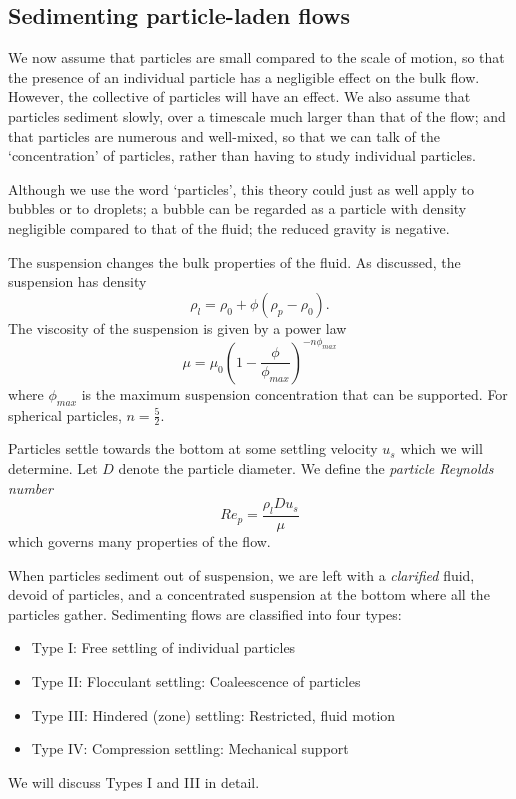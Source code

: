 \subsection{Sedimenting particle-laden flows}

We now assume that particles are small compared to the scale of motion, so that
the presence of an individual particle has a negligible effect on the bulk flow.
However, the collective of particles will have an effect. We also assume that
particles sediment slowly, over a timescale much larger than that of the flow;
and that particles are numerous and well-mixed, so that we can talk of the
`concentration' of particles, rather than having to study individual particles.

Although we use the word `particles', this theory could just as well apply to
bubbles or to droplets; a bubble can be regarded as a particle with density
negligible compared to that of the fluid; the reduced gravity is negative.

The suspension changes the bulk properties of the fluid. As discussed, the 
suspension has density
\begin{equation}
        \rho_l = \rho_0 + \phi (\rho_p - \rho_0).
\end{equation}
The viscosity of the suspension is given by a power law
\begin{equation}
 \mu = \mu_0 \left( 1 - \frac{\phi}{\phi_{max}} \right)^{-n \phi_{max}}
\end{equation}
where $\phi_{max}$ is the maximum suspension concentration that can be
supported. For spherical particles, $n = \frac{5}{2}$.

Particles settle towards the bottom at some settling velocity $u_s$ which we
will determine. Let $D$ denote the particle diameter. We define the
\textit{particle Reynolds number}
\begin{equation}
    Re_p = \frac{\rho_l D u_s}{\mu}
\end{equation}
which governs many properties of the flow.

When particles sediment out of suspension, we are left with a \textit{clarified}
fluid, devoid of particles, and a concentrated suspension at the bottom where
all the particles gather. Sedimenting flows are classified into four types:
\begin{itemize}
    \item Type I: Free settling of individual particles
    \item Type II: Flocculant settling: Coaleescence of particles
    \item Type III: Hindered (zone) settling: Restricted, fluid motion
    \item Type IV: Compression settling: Mechanical support
\end{itemize}
We will discuss Types I and III in detail.

